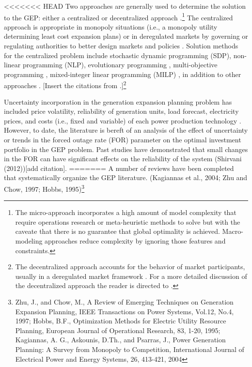 \documentclass[10pt]{amsart}
\begin{document}
<<<<<<< HEAD
Two approaches are generally used to determine the solution to the GEP: either a centralized or decentralized approach \parencite{bakirtzis:2012aa}.\footnote{The micro-approach incorporates a high amount of model complexity that require operations research or meta-heuristic methods to solve but with the caveate that there is no guarantee that global optimality is achieved. Macro-modeling approaches reduce complexity by ignoring those features and constraints.} 
The centralized approach is appropriate in monopoly situations (i.e., a monopoly utility determining least cost expansion plans) or in deregulated markets by governing or regulating authorities to better design markets and policies \parencite{bakirtzis:2012aa}.
Solution methods for the centralized problem include stochastic dynamic programming (SDP)\parencite{}, non-linear programming (NLP)\parencite{}, evolutionary programming \parencite{}, multi-objective programming \parencite{}, mixed-integer linear programming (MILP) \parencite{}, in addition to other approaches \parencite{}\parencite{bakirtzis:2012aa}.  
[Insert the citations from \cite{bakirtzis:2012aa}.]\footnote{The decentralized approach accounts for the behavior of market participants, usually in a deregulated market framework \parencite{bakirtzis:2012aa}. 
For a more detailed discussion of the decentralized approach the reader is directed to \cite{bakirtzis:2012aa}.} 

Uncertainty incorporation in the generation expansion planning problem has included price volatility, reliability of generation units, load forecast, electricity prices, and costs (i.e., fixed and variable) of each power production technology \cite{hemmati:2013ab, pereira2010decision, pereira2011generation}. 
However, to date, the literature is bereft of an analysis of the effect of uncertainty or trends in the forced outage rate (FOR) parameter on the optimal investment portfolio in the GEP problem. 
Past studies have demonstrated that small changes in the FOR can have significant effects on the reliability of the system \parencite{} (Shirvani (2012))[add citation]. 
=======
A number of reviews have been completed that systematically organize the GEP literature.
\parencite{bakirtzis:2012aa, hemmati:2013ab}(Kagiannas et al., 2004; Zhu and Chow, 1997; Hobbs, 1995)\footnote{ Zhu, J., and Chow, M., A Review of Emerging Techniques on Generation Expansion
Planning, IEEE Transactions on Power Systems, Vol.12, No.4, 1997; Hobbs, B.F., Optimization Methods for Electric Utility Resource Planning, European
Journal of Operational Research, 83, 1-20, 1995; 
Kagiannas, A. G., Askounis, D.Th., and Psarras, J., Power Generation Planning: A Survey
from Monopoly to Competition, International Journal of Electrical Power and Energy
Systems, 26, 413-421, 2004}
\end{document}
